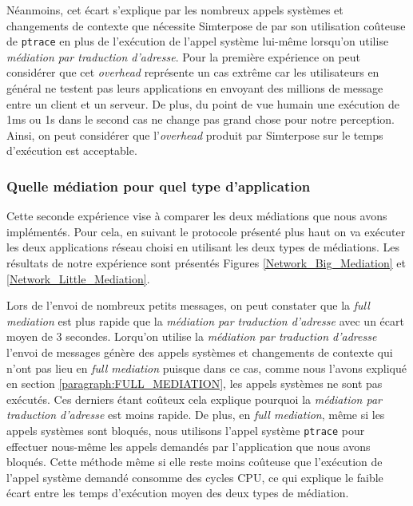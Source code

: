Néanmoins, cet écart s'explique par les nombreux appels systèmes et changements de contexte que nécessite Simterpose de par son utilisation coûteuse de \texttt{ptrace} en plus de l'exécution de l'appel système lui-même lorsqu'on utilise \textit{médiation par traduction d'adresse}. Pour la première expérience on peut considérer que cet \textit{overhead} représente un cas extrême car les utilisateurs en général ne testent pas leurs applications en envoyant des millions de message entre un client et un serveur. De plus, du point de vue humain une exécution de 1ms ou 1s dans le second cas ne change pas grand chose pour notre perception. Ainsi, on peut considérer que l'\textit{overhead} produit par Simterpose sur le temps d'exécution est acceptable.

\subsubsection{Quelle médiation pour quel type d'application}
 Cette seconde expérience vise à comparer les deux médiations que nous avons implémentés. Pour cela, en suivant le protocole présenté plus haut on va exécuter les deux applications réseau choisi en utilisant les deux types de médiations. Les résultats de notre expérience sont présentés Figures \ref{Network_Big_Mediation} et \ref{Network_Little_Mediation}.

Lors de l'envoi de nombreux petits messages, on peut constater que la \textit{full mediation} est plus rapide que la \textit{médiation par traduction d'adresse} avec un écart moyen de 3 secondes. Lorqu'on utilise la \textit{médiation par traduction d'adresse} l'envoi de messages génère des appels systèmes et changements de contexte qui n'ont pas lieu en \textit{full mediation} puisque dans ce cas, comme nous l'avons expliqué en section \ref{paragraph:FULL_MEDIATION}, les appels systèmes ne sont pas exécutés. Ces derniers étant coûteux cela explique pourquoi la  \textit{médiation par traduction d'adresse} est moins rapide. De plus, en \textit{full mediation}, même si les appels systèmes sont bloqués, nous utilisons l'appel système \texttt{ptrace} pour effectuer nous-même les appels demandés par l'application que nous avons bloqués. Cette méthode même si elle reste moins coûteuse que l'exécution de l'appel système demandé consomme des cycles CPU, ce qui explique le faible écart entre les temps d'exécution moyen des deux types de médiation.

